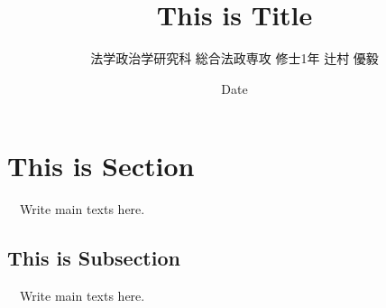 \documentclass{article}
\title{This is Title}
\author{法学政治学研究科 総合法政専攻 修士1年 辻村 優毅}
\date{Date}
\begin{document}
\maketitle

\section{This is Section}
　Write main texts here.

\subsection{This is Subsection}
　Write main texts here.


\end{document}
